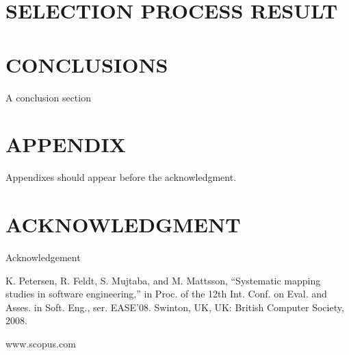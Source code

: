 \documentclass[letterpaper, 10 pt, conference]{ieeeconf}  %
\begin{document}
\section{SELECTION PROCESS RESULT}


\section{CONCLUSIONS}

A conclusion section 



\addtolength{\textheight}{-12cm}   








\section*{APPENDIX}

Appendixes should appear before the acknowledgment.

\section*{ACKNOWLEDGMENT}

Acknowledgement


\begin{thebibliography}{99}

 K. Petersen, R. Feldt, S. Mujtaba, and M. Mattsson, “Systematic mapping studies in software engineering,” in Proc. of the 12th Int. Conf. on Eval. and Asses. in Soft. Eng., ser. EASE’08. Swinton, UK, UK: British Computer Society, 2008.

 www.scopus.com







\end{thebibliography}
\end{document}
